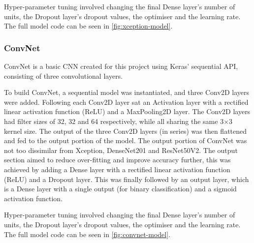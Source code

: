 Hyper-parameter tuning involved changing the final Dense layer's number of units, the Dropout layer's dropout values, the optimiser and the learning rate. The full model code can be seen in \autoref{fig:xception-model}.

\subsubsection{ConvNet}
ConvNet is a basic CNN created for this project using Keras' sequential API, consisting of three convolutional layers.

To build ConvNet, a sequential model was instantiated, and three Conv2D layers were added. Following each Conv2D layer sat an Activation layer with a rectified linear activation function (ReLU) and a MaxPooling2D layer. The Conv2D layers had filter sizes of 32, 32 and 64 respectively, while all sharing the same 3$\times$3 kernel size. The output of the three Conv2D layers (in series) was then flattened and fed to the output portion of the model. The output portion of ConvNet was not too dissimilar from Xception, DenseNet201 and ResNet50V2. The output section aimed to reduce over-fitting and improve accuracy further, this was achieved by adding a Dense layer with a rectified linear activation function (ReLU) and a Dropout layer. This was finally followed by an output layer, which is a Dense layer with a single output (for binary classification) and a sigmoid activation function.

Hyper-parameter tuning involved changing the final Dense layer's number of units, the Dropout layer's dropout values, the optimiser and the learning rate. The full model code can be seen in \autoref{fig:convnet-model}.

